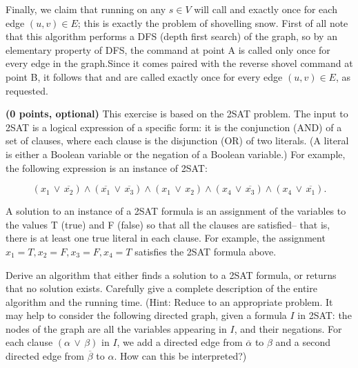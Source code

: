 \documentclass[11pt,letterpaper]{article}
\begin{document}
\begin{solution}
    Finally, we claim that running  on any $s\in V$ will call  and  exactly once for each edge $(u,v)\in E$; this is exactly the problem of shovelling snow. First of all note that this algorithm performs a DFS (depth first search) of the graph, so by an elementary property of DFS, the  command at point A is called only once for every edge in the graph.Since it comes paired with the reverse shovel command at point B, it follows that  and  are called exactly once for every edge $(u,v)\in E$, as requested. 
    
\end{solution}

\pagebreak
\begin{problem}
    {\bf (0 points, optional)} This exercise is based on the 2SAT problem.  The input to 2SAT is a logical expression of a specific form:  it is the conjunction (AND) of a set of clauses, where each clause is the disjunction (OR) of two literals.  (A literal is either a Boolean variable or the negation of a Boolean variable.)  For example, the following expression is an instance of 2SAT:
    
    \[ (x_1 \, \vee \, \overline{x_2}) \wedge (\overline{x_1} \, \vee \, \overline{x_3}) \wedge (x_1 \, \vee \, x_2) \wedge (x_4 \, \vee \, \overline{x_3}) \wedge (x_4 \, \vee \, \overline{x_1}).\]

    A solution to an instance of a 2SAT formula is an assignment of the variables to the values T (true) and F (false) so that all the clauses are satisfied-- that is, there is at least one true literal in each clause. For example, the assignment $x_1 = T, x_2 = F, x_3 = F, x_4 = T$ satisfies the 2SAT formula above.\\\hspace*{\fill}

    Derive an algorithm that either finds a solution to a 2SAT formula, or returns that no solution exists. Carefully give a complete description of the entire algorithm and the running time.  (Hint: Reduce to an appropriate problem.  It may help to consider the following directed graph, given a formula $I$ in 2SAT: the nodes of the graph are all the variables appearing in $I$, and their negations.  For each clause $(\alpha \, \vee \, \beta)$ in $I$, we add a directed edge from $\overline{\alpha}$ to $\beta$ and a second directed edge from $\overline{\beta}$ to $\alpha$.  How can this be interpreted?)
\end{problem}
\end{document}
